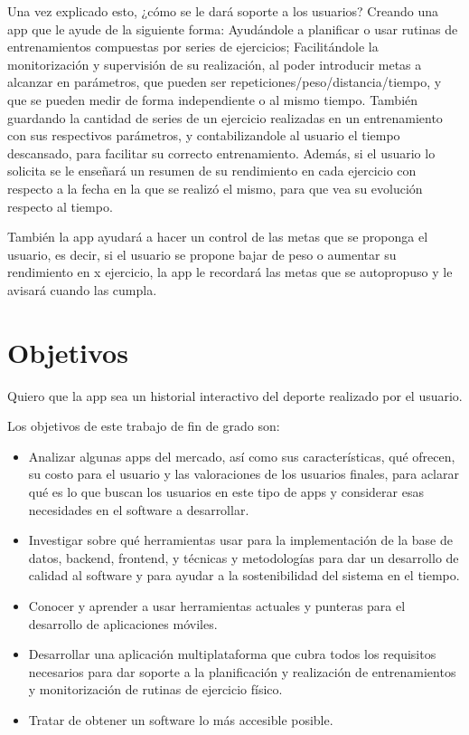 Una vez explicado esto, ¿cómo se le dará soporte a los usuarios? Creando una app que le ayude de la siguiente forma: Ayudándole a planificar o usar rutinas de entrenamientos compuestas por series de ejercicios; Facilitándole la monitorización y supervisión de su realización, al poder introducir metas a alcanzar en parámetros, que pueden ser repeticiones/peso/distancia/tiempo, y que se pueden medir de forma independiente o al mismo tiempo. También guardando la cantidad de series de un ejercicio realizadas en un entrenamiento con sus respectivos parámetros, y contabilizandole al usuario el tiempo descansado, para facilitar su correcto entrenamiento. Además, si el usuario lo solicita se le enseñará un resumen de su rendimiento en cada ejercicio con respecto a la fecha en la que se realizó el mismo, para que vea su evolución respecto al tiempo. 

También la app ayudará a hacer un control de las metas que se proponga el usuario, es decir, si el usuario se propone bajar de peso o aumentar su rendimiento en x ejercicio, la app le recordará las metas que se autopropuso y le avisará cuando las cumpla. 

\section{Objetivos}
Quiero que la app sea un historial interactivo del deporte realizado por el usuario.

Los objetivos de este trabajo de fin de grado son:

\begin{itemize}
	\item Analizar algunas apps del mercado, así como sus características, qué ofrecen, su costo para el usuario y las valoraciones de los usuarios finales, para aclarar qué es lo que buscan los usuarios en este tipo de apps y considerar esas necesidades en el software a desarrollar.
	\item Investigar sobre qué herramientas usar para la implementación de la base de datos, backend, frontend, y técnicas y metodologías para dar un desarrollo de calidad al software y para ayudar a la sostenibilidad del sistema en el tiempo.
	\item Conocer y aprender a usar herramientas actuales y punteras para el desarrollo de aplicaciones móviles. 
	\item Desarrollar una aplicación multiplataforma que cubra todos los requisitos necesarios para dar soporte a la planificación y realización de entrenamientos y monitorización de rutinas de ejercicio físico. 
	\item Tratar de obtener un software lo más accesible posible.
\end{itemize}

